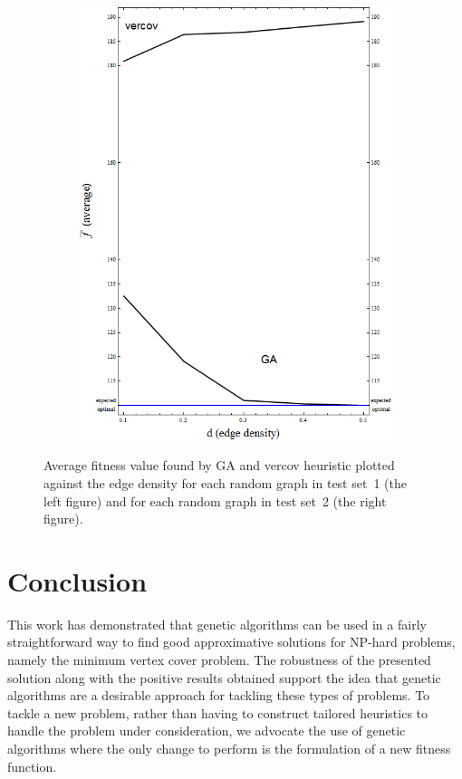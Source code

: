 \documentclass[12pt]{article}
\begin{document}
\begin{figure}[!h]
\begin{subfigure}{0.5\textwidth}
\includegraphics[width=1\linewidth]{av2}
\end{subfigure}

\caption[Average fitness value plotted against edge density]
{%
Average fitness value found by GA and vercov heuristic plotted
against the edge density
for each random graph in test set~1 (the left figure) and
for each random graph in test set~2 (the right figure).%
}
\label{fig:av}
\end{figure}



\section{Conclusion}
\label{sec:conc}
This work has demonstrated that genetic algorithms can
be used in a fairly straightforward way to find good
approximative solutions for NP-hard problems, namely
the minimum vertex cover problem.
The robustness of the presented solution along with
the positive results obtained support the idea
that genetic algorithms are a desirable approach for tackling
these types of problems.
To tackle a new problem, rather than having to construct
tailored heuristics to handle the problem under consideration,
we advocate the use of genetic algorithms where the
only change to perform is the formulation of a new fitness
function.



%
%
\printbibliography

\end{document}
